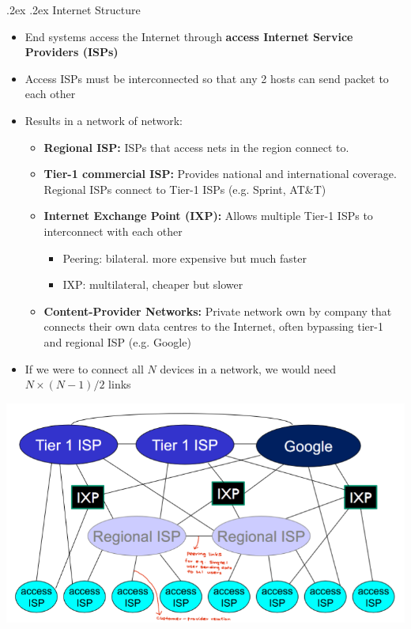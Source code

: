 \documentclass[10pt,landscape,a4paper]{article}
\makeatletter
\renewcommand{\subsubsection}{\@startsection{subsubsection}{1}{0mm}%
    {.2ex}%
    {.2ex}%
    {\rmfamily\bfseries}}
\makeatother
\begin{document}
\begin{multicols*}{4}
        \subsubsection{Internet Structure}
        \begin{itemize}
            \item End systems access the Internet through  \textbf{access Internet Service Providers (ISPs)}
            \item Access ISPs must be interconnected so that any 2 hosts can send packet to each other
            \item Results in a network of network:
                \begin{itemize}
                    \item \textbf{Regional ISP:} ISPs that access nets in the region connect to.
                    \item \textbf{Tier-1 commercial ISP:} Provides national and international coverage. Regional ISPs connect to Tier-1 ISPs (e.g. Sprint, AT\&T)
                    \item \textbf{Internet Exchange Point (IXP):} Allows multiple Tier-1 ISPs to interconnect with each other
                    \begin{itemize}
                        \item Peering: bilateral. more expensive but much faster
                        \item IXP: multilateral, cheaper but slower
                    \end{itemize}
                    \item \textbf{Content-Provider Networks:} Private network own by company that connects their own data centres to the Internet, often bypassing tier-1 and regional ISP (e.g. Google)
                \end{itemize}
           \item If we were to connect all $N$ devices in a network, we would need $N \times{(N-1)} \slash{2}$ links\\
        \end{itemize}
        \begin{center}
            \includegraphics[scale=0.4]{internet_structure}
        \end{center}

\end{multicols*}
\end{document}
